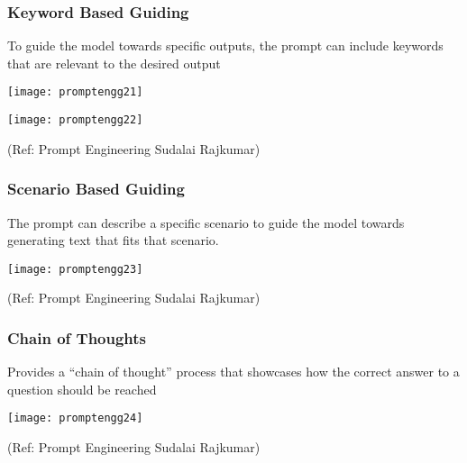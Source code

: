 \begin{frame}[fragile]\frametitle{ Keyword Based Guiding}

To guide the model towards specific outputs, the prompt can include 
keywords that are relevant to the desired output

\begin{center}
\texttt{[image: promptengg21]}

\texttt{[image: promptengg22]}

{\tiny (Ref: Prompt Engineering Sudalai Rajkumar)}

\end{center}		
		
		
		


\end{frame}

\begin{frame}[fragile]\frametitle{ Scenario Based Guiding}

The prompt can describe a specific scenario to guide the model towards 
generating text that fits that scenario.

\begin{center}
\texttt{[image: promptengg23]}

{\tiny (Ref: Prompt Engineering Sudalai Rajkumar)}

\end{center}		
		
		
		


\end{frame}

\begin{frame}[fragile]\frametitle{Chain of Thoughts}

Provides a “chain of thought” process that 
showcases how the correct answer to a question should be reached

\begin{center}
\texttt{[image: promptengg24]}

{\tiny (Ref: Prompt Engineering Sudalai Rajkumar)}

\end{center}		

\end{frame}

